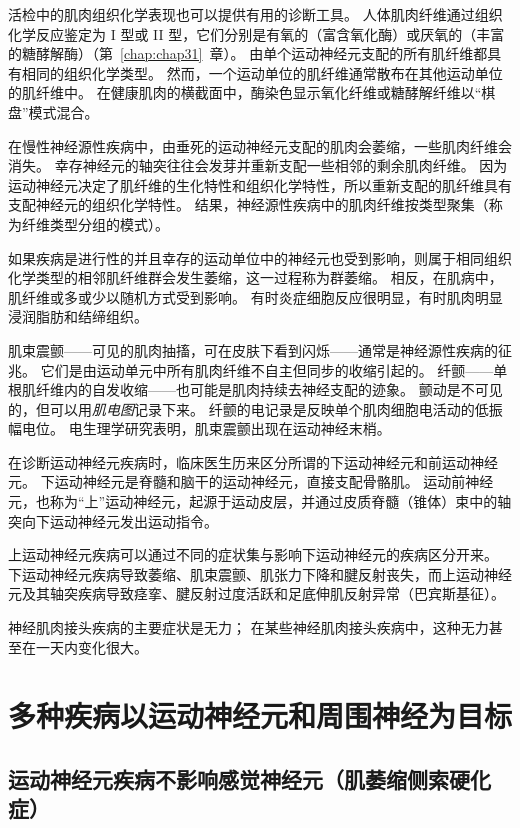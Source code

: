 活检中的肌肉组织化学表现也可以提供有用的诊断工具。
人体肌肉纤维通过组织化学反应鉴定为 I 型或 II 型，它们分别是有氧的（富含氧化酶）或厌氧的（丰富的糖酵解酶）（第~\ref{chap:chap31}~章）。
由单个运动神经元支配的所有肌纤维都具有相同的组织化学类型。
然而，一个运动单位的肌纤维通常散布在其他运动单位的肌纤维中。
在健康肌肉的横截面中，酶染色显示氧化纤维或糖酵解纤维以“棋盘”模式混合。


在慢性神经源性疾病中，由垂死的运动神经元支配的肌肉会萎缩，一些肌肉纤维会消失。
幸存神经元的轴突往往会发芽并重新支配一些相邻的剩余肌肉纤维。
因为运动神经元决定了肌纤维的生化特性和组织化学特性，所以重新支配的肌纤维具有支配神经元的组织化学特性。
结果，神经源性疾病中的肌肉纤维按类型聚集（称为纤维类型分组的模式）。


如果疾病是进行性的并且幸存的运动单位中的神经元也受到影响，则属于相同组织化学类型的相邻肌纤维群会发生萎缩，这一过程称为群萎缩。
相反，在肌病中，肌纤维或多或少以随机方式受到影响。
有时炎症细胞反应很明显，有时肌肉明显浸润脂肪和结缔组织。


肌束震颤——可见的肌肉抽搐，可在皮肤下看到闪烁——通常是神经源性疾病的征兆。
它们是由运动单元中所有肌肉纤维不自主但同步的收缩引起的。
纤颤——单根肌纤维内的自发收缩——也可能是肌肉持续去神经支配的迹象。
颤动是不可见的，但可以用\textit{肌电图}记录下来。
纤颤的电记录是反映单个肌肉细胞电活动的低振幅电位。
电生理学研究表明，肌束震颤出现在运动神经末梢。


在诊断运动神经元疾病时，临床医生历来区分所谓的下运动神经元和前运动神经元。
下运动神经元是脊髓和脑干的运动神经元，直接支配骨骼肌。
运动前神经元，也称为“上”运动神经元，起源于运动皮层，并通过皮质脊髓（锥体）束中的轴突向下运动神经元发出运动指令。


上运动神经元疾病可以通过不同的症状集与影响下运动神经元的疾病区分开来。
下运动神经元疾病导致萎缩、肌束震颤、肌张力下降和腱反射丧失，而上运动神经元及其轴突疾病导致痉挛、腱反射过度活跃和足底伸肌反射异常（巴宾斯基征）。


神经肌肉接头疾病的主要症状是无力；
在某些神经肌肉接头疾病中，这种无力甚至在一天内变化很大。



\section{多种疾病以运动神经元和周围神经为目标}

\subsection{运动神经元疾病不影响感觉神经元（肌萎缩侧索硬化症）}

